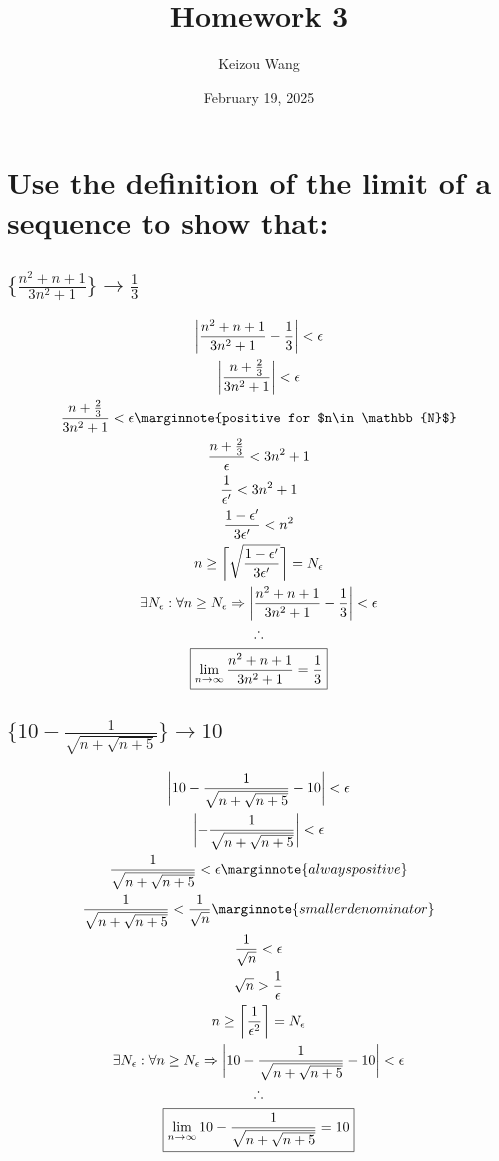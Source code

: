 \documentclass[letterpaper]{article}
\title{Homework 3}
\author{Keizou Wang}
\date{February 19, 2025}
\DeclarePairedDelimiter{\ceil}{\lceil}{\rceil}
\DeclarePairedDelimiter\abs{\lvert}{\rvert}
\begin{document}
\maketitle

\section{Use the definition of the limit of a sequence to show that:}
\subsection{$\{\frac{n^2+n+1}{3n^2+1}\}\rightarrow\frac{1}{3}$}
\begin{gather*}
\abs[\bigg]{\frac{n^2+n+1}{3n^2+1}-\frac{1}{3}}<\epsilon \\
\abs[\bigg]{\frac{n+\frac{2}{3}}{3n^2+1}}<\epsilon \\
\frac{n+\frac{2}{3}}{3n^2+1}<\epsilon \marginnote{positive for $n\in\mathbb{N}$} \\
\frac{n+\frac{2}{3}}{\epsilon}<3n^2+1 \\
\frac{1}{\epsilon'}<3n^2+1 \\
\frac{1-\epsilon'}{3\epsilon'}<n^2 \\
n\geq\ceil[\bigg]{\sqrt{\frac{1-\epsilon'}{3\epsilon'}}}=N_\epsilon \\
\exists N_\epsilon:\forall n\geq N_\epsilon\Rightarrow\abs[\bigg]{\frac{n^2+n+1}{3n^2+1}-\frac{1}{3}}<\epsilon \\
\therefore \\
\boxed{\lim_{n\rightarrow\infty}\frac{n^2+n+1}{3n^2+1}=\frac{1}{3}}
\end{gather*}
\subsection{$\{10-\frac{1}{\sqrt{n+\sqrt{n+5}}}\}\rightarrow10$}
\begin{gather*}
\abs[\bigg]{10-\frac{1}{\sqrt{n+\sqrt{n+5}}}-10}<\epsilon \\
\abs[\bigg]{-\frac{1}{\sqrt{n+\sqrt{n+5}}}}<\epsilon \\
\frac{1}{\sqrt{n+\sqrt{n+5}}}<\epsilon \marginnote{always positive} \\
\frac{1}{\sqrt{n+\sqrt{n+5}}}<\frac{1}{\sqrt{n}} \marginnote{smaller denominator} \\
\frac{1}{\sqrt{n}}<\epsilon \\
\sqrt{n}>\frac{1}{\epsilon} \\
n\geq\ceil[\bigg]{\frac{1}{\epsilon^2}}=N_\epsilon \\
\exists N_\epsilon:\forall n\geq N_\epsilon\Rightarrow\abs[\bigg]{10-\frac{1}{\sqrt{n+\sqrt{n+5}}}-10}<\epsilon \\
\therefore \\
\boxed{\lim_{n\rightarrow\infty}10-\frac{1}{\sqrt{n+\sqrt{n+5}}}=10}
\end{gather*}
\end{document}
